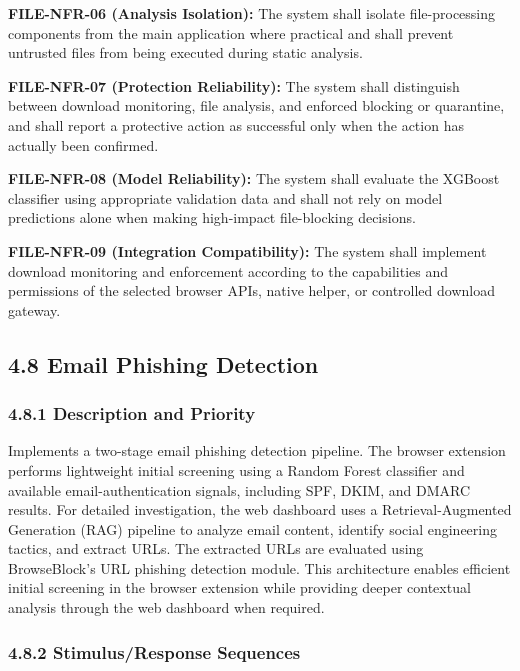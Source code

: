 \documentclass[12pt,a4paper]{report}
\let\originaladdcontentsline\addcontentsline
\renewcommand{\addcontentsline}[3]{\phantomsection\originaladdcontentsline{#1}{#2}{#3}}
\begin{document}
\textbf{FILE-NFR-06 (Analysis Isolation):} The system shall isolate file-processing components from the main application where practical and shall prevent untrusted files from being executed during static analysis.\par

\textbf{FILE-NFR-07 (Protection Reliability):} The system shall distinguish between download monitoring, file analysis, and enforced blocking or quarantine, and shall report a protective action as successful only when the action has actually been confirmed.\par

\textbf{FILE-NFR-08 (Model Reliability):} The system shall evaluate the XGBoost classifier using appropriate validation data and shall not rely on model predictions alone when making high-impact file-blocking decisions.\par

\textbf{FILE-NFR-09 (Integration Compatibility):} The system shall implement download monitoring and enforcement according to the capabilities and permissions of the selected browser APIs, native helper, or controlled download gateway.\par
\subsection*{4.8 Email Phishing Detection}

\subsubsection*{4.8.1 Description and Priority}

Implements a two-stage email phishing detection pipeline. The browser extension performs lightweight initial screening using a Random Forest classifier and available email-authentication signals, including SPF, DKIM, and DMARC results. For detailed investigation, the web dashboard uses a Retrieval-Augmented Generation (RAG) pipeline to analyze email content, identify social engineering tactics, and extract URLs. The extracted URLs are evaluated using BrowseBlock's URL phishing detection module. This architecture enables efficient initial screening in the browser extension while providing deeper contextual analysis through the web dashboard when required.\par

\subsubsection*{4.8.2 Stimulus/Response Sequences}
\end{document}
